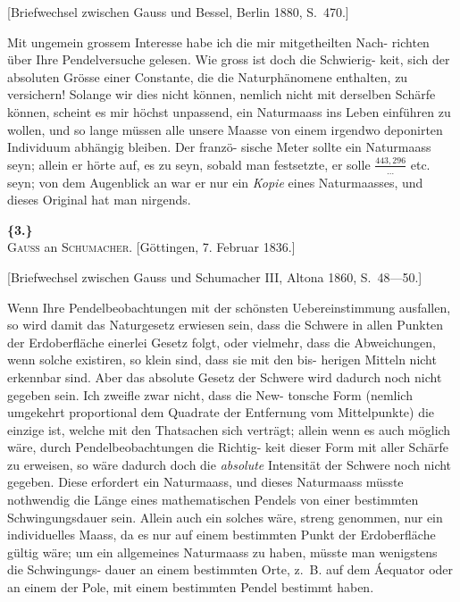 \documentclass[12pt,a4paper]{article}
\theoremstyle{plain}
\theoremstyle{definition}
\theoremstyle{remark}
\begin{document}
\vspace{0.2cm}
{\small[Briefwechsel zwischen Gauss und Bessel, Berlin 1880, S.~470.]}

\vspace{0.3cm}

Mit ungemein grossem Interesse habe ich die mir mitgetheilten Nach-
richten \"uber Ihre Pendelversuche gelesen. Wie gross ist doch die Schwierig-
keit, sich der absoluten Gr\"osse einer Constante, die die Naturph\"anomene
enthalten, zu versichern! Solange wir dies nicht k\"onnen, nemlich nicht mit
derselben Sch\"arfe k\"onnen, scheint es mir h\"ochst unpassend, ein Naturmaass
ins Leben einf\"uhren zu wollen, und so lange m\"ussen alle unsere Maasse
von einem irgendwo deponirten Individuum abh\"angig bleiben. Der franz\"o-
sische Meter sollte ein Naturmaass seyn; allein er h\"orte auf, es zu seyn,
sobald man festsetzte, er solle $\frac{443,296}{\ldots}$ etc. seyn; von dem Augenblick an
war er nur ein \textit{Kopie} eines Naturmaasses, und dieses Original hat man
nirgends.

\vspace{0.5cm}

\noindent\textbf{\{3.\}}\\
\textsc{Gauss} an \textsc{Schumacher}. [G\"ottingen, 7. Februar 1836.]

\vspace{0.2cm}
{\small[Briefwechsel zwischen Gauss und Schumacher III, Altona 1860, S.~48---50.]}

\vspace{0.3cm}

Wenn Ihre Pendelbeobachtungen mit der sch\"onsten Uebereinstimmung
ausfallen, so wird damit das Naturgesetz erwiesen sein, dass die Schwere in
allen Punkten der Erdoberfl\"ache einerlei Gesetz folgt, oder vielmehr, dass
die Abweichungen, wenn solche existiren, so klein sind, dass sie mit den bis-
herigen Mitteln nicht erkennbar sind. Aber das absolute Gesetz der Schwere
wird dadurch noch nicht gegeben sein. Ich zweifle zwar nicht, dass die New-
tonsche Form (nemlich umgekehrt proportional dem Quadrate der Entfernung
vom Mittelpunkte) die einzige ist, welche mit den Thatsachen sich vertr\"agt;
allein wenn es auch m\"oglich w\"are, durch Pendelbeobachtungen die Richtig-
keit dieser Form mit aller Sch\"arfe zu erweisen, so w\"are dadurch doch die
\textit{absolute} Intensit\"at der Schwere noch nicht gegeben. Diese erfordert ein
Naturmaass, und dieses Naturmaass m\"usste nothwendig die L\"ange eines
mathematischen Pendels von einer bestimmten Schwingungsdauer sein. Allein
auch ein solches w\"are, streng genommen, nur ein individuelles Maass, da es
nur auf einem bestimmten Punkt der Erdoberfl\"ache g\"ultig w\"are; um ein
allgemeines Naturmaass zu haben, m\"usste man wenigstens die Schwingungs-
dauer an einem bestimmten Orte, z.~B. auf dem \'Aequator oder an einem der
Pole, mit einem bestimmten Pendel bestimmt haben.
\end{document}
